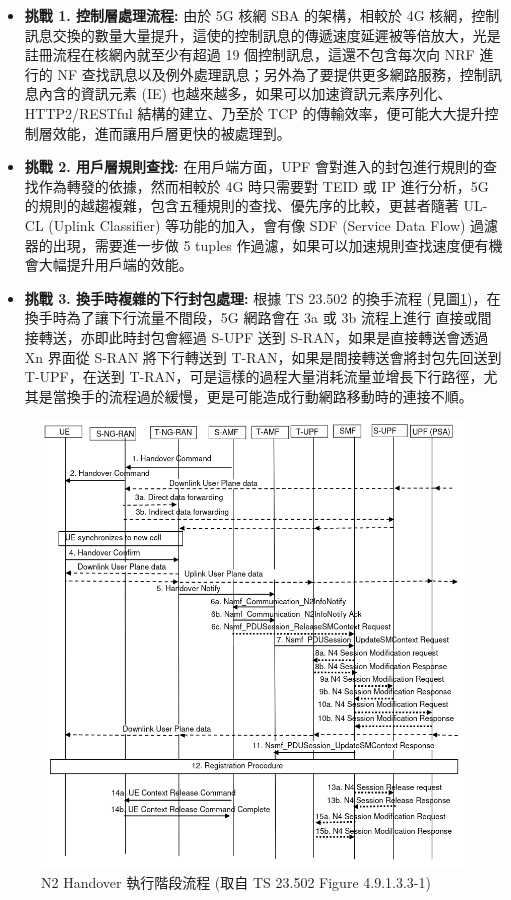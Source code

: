 \begin{itemize}
\item \textbf{挑戰 1. 控制層處理流程:} 由於 5G 核網 SBA 的架構，相較於 4G 核網，控制訊息交換的數量大量提升，這使的控制訊息的傳遞速度延遲被等倍放大，光是註冊流程在核網內就至少有超過 19 個控制訊息，這還不包含每次向 NRF 進行的 NF 查找訊息以及例外處理訊息；另外為了要提供更多網路服務，控制訊息內含的資訊元素 (IE) 也越來越多，如果可以加速資訊元素序列化、HTTP2/RESTful 結構的建立、乃至於 TCP 的傳輸效率，便可能大大提升控制層效能，進而讓用戶層更快的被處理到。
\item \textbf{挑戰 2. 用戶層規則查找:} 在用戶端方面，UPF 會對進入的封包進行規則的查找作為轉發的依據，然而相較於 4G 時只需要對 TEID 或 IP 進行分析，5G 的規則的越趨複雜，包含五種規則的查找、優先序的比較，更甚者隨著 UL-CL (Uplink Classifier) 等功能的加入，會有像 SDF (Service Data Flow) 過濾器的出現，需要進一步做 5 tuples 作過濾，如果可以加速規則查找速度便有機會大幅提升用戶端的效能。
\item \textbf{挑戰 3. 換手時複雜的下行封包處理:} 根據 TS 23.502 的換手流程 (見圖\ref{fig:n2_hand_exec_proc})，在換手時為了讓下行流量不間段，5G 網路會在 3a 或 3b 流程上進行 直接或間接轉送，亦即此時封包會經過 S-UPF 送到 S-RAN，如果是直接轉送會透過 Xn 界面從 S-RAN 將下行轉送到 T-RAN，如果是間接轉送會將封包先回送到 T-UPF，在送到 T-RAN，可是這樣的過程大量消耗流量並增長下行路徑，尤其是當換手的流程過於緩慢，更是可能造成行動網路移動時的連接不順。
\end{itemize}

\begin{figure}[htbp]
    \centering
    \includegraphics[height=!,width=0.9\linewidth,keepaspectratio=true]{figures/23_502_4_9_1_3_3-1_N2_handover_exec.png}
    \caption[N2 Handover 執行階段流程]{{\footnotesize N2 Handover 執行階段流程 (取自 TS 23.502 Figure 4.9.1.3.3-1\cite{3gpp.23.502})}}
    \label{fig:n2_hand_exec_proc}
\end{figure}


